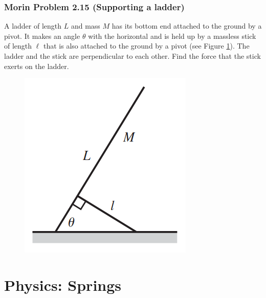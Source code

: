 \documentclass{article}
\begin{document}
\subsubsection{Morin Problem 2.15 (Supporting a ladder)}
A ladder of length $L$ and mass $M$ has its bottom end attached to the ground by a pivot. It makes an angle $\theta$ with the horizontal and is held up by a massless stick of length $\ell$ that is also attached to the ground by a pivot (see Figure \ref{fig:morin2.15}). The ladder and the stick are perpendicular to each other. Find the force that the stick exerts on the ladder.\\
{
\begin{figure} 
\includegraphics[width=\linewidth]{images/morin2.15.png}
\label{fig:morin2.15}
\end{figure}
}

\clearpage

\section{Physics: Springs}
\end{document}
